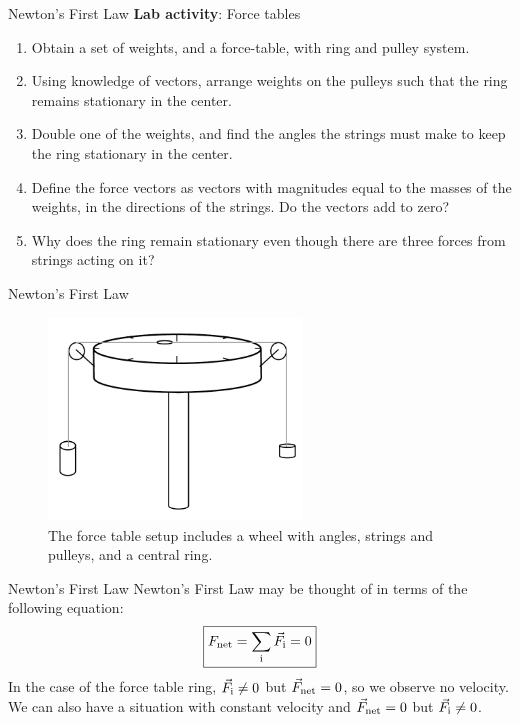 \documentclass{beamer}
\begin{document}
\begin{frame}{Newton's First Law}
\small
\textbf{Lab activity}: Force tables
\begin{enumerate}
\item Obtain a set of weights, and a force-table, with ring and pulley system.
\item Using knowledge of vectors, arrange weights on the pulleys such that the ring remains stationary in the center.
\item Double one of the weights, and find the angles the strings must make to keep the ring stationary in the center.
\item Define the force vectors as vectors with magnitudes equal to the masses of the weights, in the directions of the strings.  Do the vectors add to zero?
\item Why does the ring remain stationary even though there are three forces from strings acting on it?
\end{enumerate}
\end{frame}

\begin{frame}{Newton's First Law}
\begin{figure}
\centering
\includegraphics[width=0.6\textwidth]{figures/Table.pdf}
\caption{\label{fig:table} The force table setup includes a wheel with angles, strings and pulleys, and a central ring.}
\end{figure}
\end{frame}

\begin{frame}{Newton's First Law}
Newton's First Law may be thought of in terms of the following equation:
\begin{equation}
\boxed{F_{\rm net} = \sum_{\rm i} \vec{F}_{\rm i} = 0}
\label{eq:firstlaw}
\end{equation}
In the case of the force table ring, $\vec{F}_{\rm i} \neq 0$ but $\vec{F}_{\rm net} = 0$, so we observe no velocity.  We can also have a situation with constant velocity and $\vec{F}_{\rm net} = 0$  but $\vec{F}_{\rm i} \neq 0$.
\end{frame}
\end{document}
